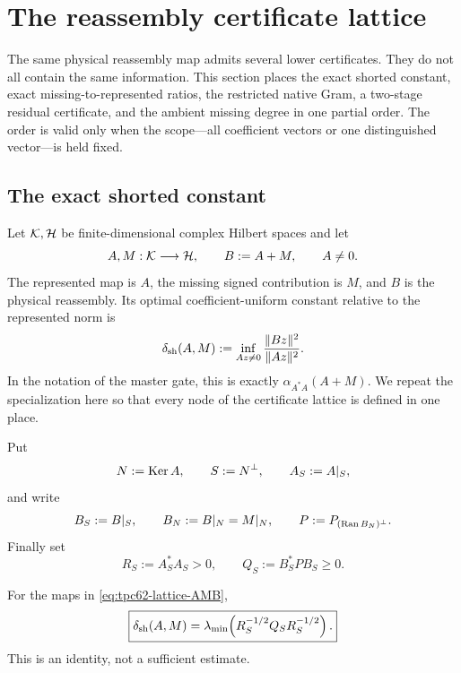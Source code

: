 \section{The reassembly certificate lattice}
\label{sec:tpc62-certificate-lattice}

The same physical reassembly map admits several lower certificates.  They
do not all contain the same information.  This section places the exact
shorted constant, exact missing-to-represented ratios, the restricted
native Gram, a two-stage residual certificate, and the ambient missing
degree in one partial order.  The order is valid only when the scope---all
coefficient vectors or one distinguished vector---is held fixed.

\subsection{The exact shorted constant}

Let \(\mathcal K,\mathcal H\) be finite-dimensional complex Hilbert spaces and let
\begin{equation}
 A,M:\mathcal K\longrightarrow\mathcal H,
 \qquad B:=A+M,
 \qquad A\ne0.
 \label{eq:tpc62-lattice-AMB}
\end{equation}
The represented map is \(A\), the missing signed contribution is \(M\),
and \(B\) is the physical reassembly.  Its optimal coefficient-uniform
constant relative to the represented norm is
\begin{equation}
 \delta_{\rm sh}(A,M)
 :=\inf_{Az\ne0}\frac{\|Bz\|^2}{\|Az\|^2}.
 \label{eq:tpc62-lattice-delta-definition}
\end{equation}
In the notation of the master gate, this is exactly
\(\alpha_{A^*A}(A+M)\).  We repeat the specialization here so that every
node of the certificate lattice is defined in one place.

Put
\begin{equation}
 N:=\operatorname{Ker} A,
 \qquad S:=N^\perp,
 \qquad A_S:=A|_S,
 \label{eq:tpc62-lattice-NS}
\end{equation}
and write
\begin{equation}
 B_S:=B|_S,
 \qquad B_N:=B|_N=M|_N,
 \qquad P:=P_{(\operatorname{Ran} B_N)^\perp}.
 \label{eq:tpc62-lattice-BSBP}
\end{equation}
Finally set
\begin{equation}
 R_S:=A_S^*A_S>0,
 \qquad Q_S:=B_S^*PB_S\ge0.
 \label{eq:tpc62-lattice-RQ}
\end{equation}

\begin{theorem}
\label{thm:tpc62-lattice-exact-shorted}
For the maps in \eqref{eq:tpc62-lattice-AMB},
\begin{equation}
 \boxed{
 \delta_{\rm sh}(A,M)
 =\lambda_{\min}\!\left(
   R_S^{-1/2}Q_SR_S^{-1/2}
  \right).}
 \label{eq:tpc62-lattice-exact-shorted-formula}
\end{equation}
This is an identity, not a sufficient estimate.
\end{theorem}

